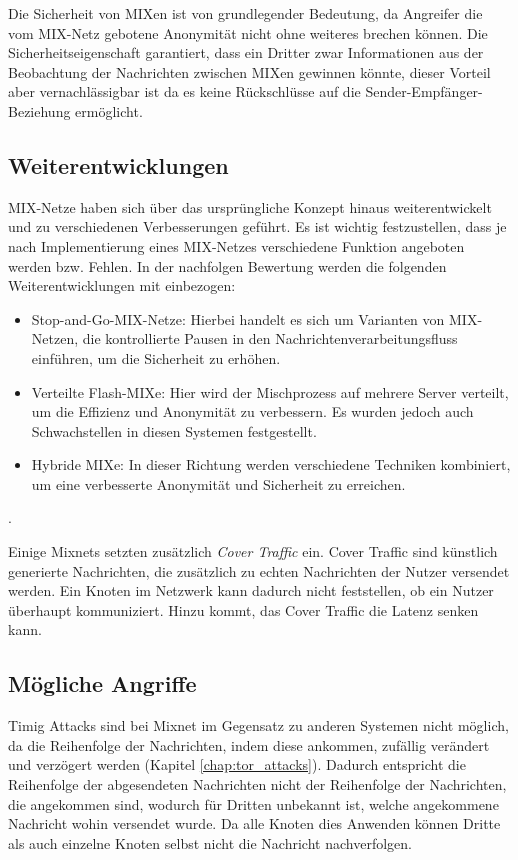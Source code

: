 Die Sicherheit von MIXen ist von grundlegender Bedeutung, da Angreifer die vom MIX-Netz gebotene Anonymität nicht ohne weiteres brechen können. Die Sicherheitseigenschaft garantiert, dass ein Dritter zwar Informationen aus der Beobachtung der Nachrichten zwischen MIXen gewinnen könnte, dieser Vorteil aber vernachlässigbar ist da es keine Rückschlüsse auf die Sender-Empfänger-Beziehung ermöglicht.

\subsection{Weiterentwicklungen}
\label{chap:mixnet_enhancements}

MIX-Netze haben sich über das ursprüngliche Konzept hinaus weiterentwickelt und zu verschiedenen Verbesserungen geführt. Es ist wichtig festzustellen, dass je nach Implementierung eines MIX-Netzes verschiedene Funktion angeboten werden bzw. Fehlen. In der nachfolgen Bewertung werden die folgenden Weiterentwicklungen mit einbezogen:

\begin{itemize}
    \item Stop-and-Go-MIX-Netze: Hierbei handelt es sich um Varianten von MIX-Netzen, die kontrollierte Pausen in den Nachrichtenverarbeitungsfluss einführen, um die Sicherheit zu erhöhen.
    \item Verteilte \glqq Flash-MIXe\grqq: Hier wird der Mischprozess auf mehrere Server verteilt, um die Effizienz und Anonymität zu verbessern. Es wurden jedoch auch Schwachstellen in diesen Systemen festgestellt.
    \item Hybride MIXe: In dieser Richtung werden verschiedene Techniken kombiniert, um eine verbesserte Anonymität und Sicherheit zu erreichen\cite{MIXNetReliability}.
\end{itemize}.

Einige Mixnets setzten zusätzlich \textit{Cover Traffic} ein. Cover Traffic sind künstlich generierte Nachrichten, die zusätzlich zu echten Nachrichten der Nutzer versendet werden. Ein Knoten im Netzwerk kann dadurch nicht feststellen, ob ein Nutzer überhaupt kommuniziert. Hinzu kommt, das Cover Traffic die Latenz senken kann\cite{MixnetOptimizationMethods}.

\subsection{Mögliche Angriffe}
\label{chap:mixnet_attacks}

Timig Attacks sind bei Mixnet im Gegensatz zu anderen Systemen nicht möglich, da die Reihenfolge der Nachrichten, indem diese ankommen, zufällig verändert und verzögert werden (Kapitel \ref{chap:tor_attacks}). Dadurch entspricht die Reihenfolge der abgesendeten Nachrichten nicht der Reihenfolge der Nachrichten, die angekommen sind, wodurch für Dritten unbekannt ist, welche angekommene Nachricht wohin versendet wurde. Da alle Knoten dies Anwenden können Dritte als auch einzelne Knoten selbst nicht die Nachricht nachverfolgen\cite{MixNetworksSecureApplications}.

